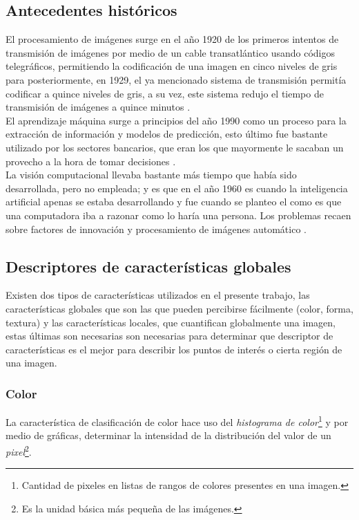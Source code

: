 \documentclass[review]{elsarticle}
\begin{document}
\subsection{Antecedentes históricos}
El procesamiento de imágenes surge en el año 1920 de los primeros intentos de transmisión de imágenes por medio de un cable transatlántico usando códigos telegráficos, permitiendo la codificación de una imagen en cinco niveles de gris para posteriormente, en 1929, el ya mencionado sistema de transmisión permitía codificar a quince niveles de gris, a su vez, este sistema redujo el tiempo de transmisión de imágenes a quince minutos \citep{rf4}.\\

El aprendizaje máquina surge a principios del año 1990 como un proceso para la extracción de información y modelos de predicción, esto último fue bastante utilizado por los sectores bancarios, que eran los que mayormente le sacaban un provecho a la hora de tomar decisiones \citep{rf5}.\\ 

La visión computacional llevaba bastante más tiempo que había sido desarrollada, pero no empleada; y es que en el año 1960 es cuando la inteligencia artificial apenas se estaba desarrollando y fue cuando se planteo el como es que una computadora iba a razonar como lo haría una persona. Los problemas recaen sobre factores de innovación y procesamiento de imágenes automático \citep{rf6}.

\subsection{Descriptores de características globales}
Existen dos tipos de características utilizados en el presente trabajo, las características globales que son las que pueden percibirse fácilmente (color, forma, textura) y las características locales, que cuantifican globalmente una imagen, estas últimas son necesarias son necesarias para determinar que descriptor de características es el mejor para describir los puntos de interés o cierta región de una imagen.
\clearpage

\subsubsection{Color}
La característica de clasificación de color hace uso del \emph{histograma de color}\footnote{Cantidad de pixeles en listas de rangos de colores presentes en una imagen.} y por medio de gráficas, determinar la intensidad de la distribución del valor de un \emph{pixel}\footnote{Es la unidad básica más pequeña de las imágenes.}.
\end{document}
